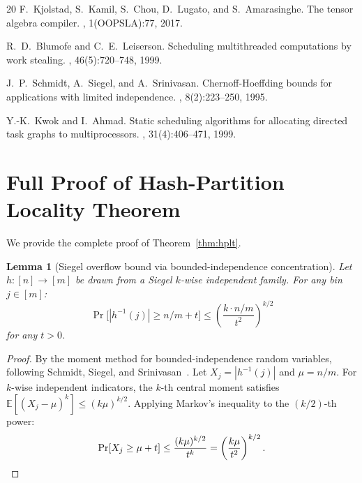 \documentclass[11pt]{article}
\newtheorem{lemma}[theorem]{Lemma}
\begin{document}
\begin{thebibliography}{20}
F.~Kjolstad, S.~Kamil, S.~Chou, D.~Lugato, and S.~Amarasinghe.
\newblock The tensor algebra compiler.
, 1(OOPSLA):77, 2017.

R.~D.~Blumofe and C.~E.~Leiserson.
\newblock Scheduling multithreaded computations by work stealing.
, 46(5):720--748, 1999.

J.~P.~Schmidt, A.~Siegel, and A.~Srinivasan.
\newblock Chernoff-Hoeffding bounds for applications with limited independence.
, 8(2):223--250, 1995.

Y.-K.~Kwok and I.~Ahmad.
\newblock Static scheduling algorithms for allocating directed task graphs to
  multiprocessors.
, 31(4):406--471, 1999.

\end{thebibliography}

\appendix

\section{Full Proof of Hash-Partition Locality Theorem}
\label{app:proofs}

We provide the complete proof of Theorem~\ref{thm:hplt}.

\begin{lemma}[Siegel overflow bound via bounded-independence concentration]
\label{lem:siegel_overflow}
Let $h: [n] \to [m]$ be drawn from a Siegel $k$-wise independent family.
For any bin $j \in [m]$:
\[
  \Pr\bigl[|h^{-1}(j)| \ge n/m + t\bigr] \le \left(\frac{k \cdot n/m}{t^2}\right)^{k/2}
\]
for any $t > 0$.
\end{lemma}

\begin{proof}
By the moment method for bounded-independence random variables,
following Schmidt, Siegel, and Srinivasan~\cite{schmidt1995chernoff}.
Let $X_j = |h^{-1}(j)|$ and $\mu = n/m$.  For $k$-wise independent
indicators, the $k$-th central moment satisfies
$\mathbb{E}[(X_j - \mu)^k] \le (k\mu)^{k/2}$.
Applying Markov's inequality to the $(k/2)$-th power:
\[
  \Pr[X_j \ge \mu + t] \le \frac{(k\mu)^{k/2}}{t^{k}}
  = \left(\frac{k\mu}{t^2}\right)^{k/2}. \qedhere
\]
\end{proof}
\end{document}
